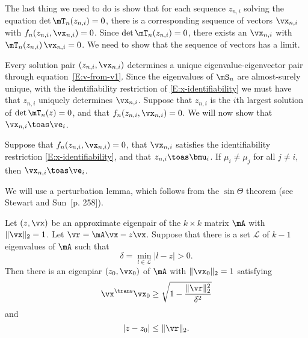 The last thing we need to do is show that for each sequence
$z_{n,i}$ solving the equation $\det \mT_n(z_{n,i}) = 0$, there is a corresponding sequence
of vectors $\vx_{n,i}$ with $f_n(z_{n,i}, \vx_{n,i}) = 0$.  Since $\det \mT_n (z_{n,i}) = 0$, there exists an $\vx_{n,i}$ with 
$\mT_{n} (z_{n,i}) \, \vx_{n,i} = 0$.  We need to show that the sequence of vectors has a limit.

Every solution pair $(z_{n,i}, \vx_{n,i})$ determines a unique
eigenvalue-eigenvector pair through equation~\eqref{E:v-from-v1}.  Since the eigenvalues of $\mS_n$ are almost-surely unique, with
the identifiability restriction of \eqref{E:x-identifiability} we must have that $z_{n,i}$ uniquely determines $\vx_{n,i}$.  Suppose that $z_{n,i}$ is the $i$th largest solution of $\det \mT_n(z) = 0$, and that $f_n( z_{n,i}, \vx_{n,i}) = 0$.  We will now show that $\vx_{n,i} \toas \ve_i$.

\begin{lemma}\label{L:xn-converges}
    Suppose that $f_n(z_{n,i}, \vx_{n,i}) = 0$, that $\vx_{n,i}$ satisfies the 
    identifiability restriction \eqref{E:x-identifiability}, and that
    $z_{n,i} \toas \bmu_i$.
    If $\mu_i \neq \mu_j$ for all $j \neq i$, then $\vx_{n,i} \toas \ve_i$.
\end{lemma}

We will use a perturbation lemma, which follows from the $\sin \Theta$ theorem (see Stewart and Sun~\cite{stewart1990mpt}[p. 258]).

\begin{lemma}\label{L:approx-eigenpair}
    Let $(z,\vx)$ be an approximate eigenpair of the $k\times k$
    matrix $\mA$ with $\| \vx \|_2 = 1$.  Let $\vr = \mA \vx - z \vx$.
    Suppose that there is a set $\mathcal{L}$ of $k-1$ eigenvalues of $\mA$ 
    such that
    \[
        \delta = \min_{l \in \mathcal{L}} | l - z | > 0.
    \]
    Then there is an eigenpiar $(z_0, \vx_0)$ of $\mA$ with 
    $\| \vx_0 \|_2 = 1$ satisfying
    \[
        \vx^\trans \vx_0
            \geq
                \sqrt{ 1 - \frac{\|\vr\|_2^2}{ \delta^2 } }
    \]
    and
    \[
        | z - z_0 |
            \leq \| \vr \|_2.
    \]
\end{lemma}

